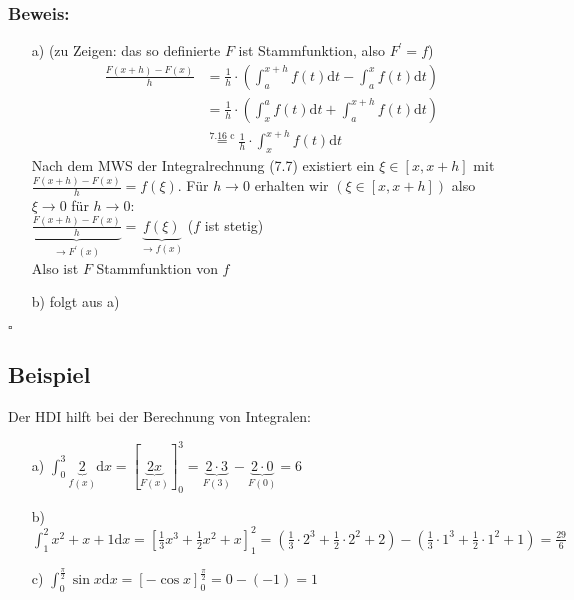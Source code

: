 \documentclass[12pt, titlepage]{article}
\renewcommand{\>}{\rightarrow}
\renewcommand{\*}{\cdot}
\begin{document}
	\subsubsection*{Beweis:}
	\begin{itemize}
		\item[a)] (zu Zeigen: das so definierte $F$ ist Stammfunktion, also $F^\prime=f$)
		\begin{align*}
			\frac{F(x+h)-F(x)}{h}&=\frac{1}{h}\*(\int_{a}^{x+h}f(t)\textrm{d}t-\int_{a}^{x}f(t)\textrm{d}t)\\
			&=\frac{1}{h}\*(\int_{x}^{a}f(t)\textrm{d}t+\int_{a}^{x+h}f(t)\textrm{d}t)\\
			&\overset{\textrm{7.16 c}}{=}\frac{1}{h}\*\int_{x}^{x+h}f(t)\textrm{d}t
		\end{align*}
		Nach dem MWS der Integralrechnung (7.7) existiert ein $\xi\in[x,x+h]$ mit $\frac{F(x+h)-F(x)}{h}=f(\xi)$. Für $h\>0$ erhalten wir $(\xi\in[x,x+h])$ also $\xi\>0$ für $h\>0$:\\
		$\underbrace{\frac{F(x+h)-F(x)}{h}}_{\>F^\prime(x)}=\underbrace{f(\xi)}_{\>f(x)}$ ($f$ ist stetig)\\
		Also ist $F$ Stammfunktion von $f$
		\item[b)] folgt aus a)
	\end{itemize}
	\hfill$\square$
	\subsection{Beispiel}
	Der HDI hilft bei der Berechnung von Integralen:
	\begin{itemize}
		\item[a)] $\int_{0}^{3}\underbrace{2}_{f(x)}\textrm{d}x=[\underbrace{2x}_{F(x)}]^3_0=\underbrace{2\*3}_{F(3)}-\underbrace{2\*0}_{F(0)}=6$
		\item[b)] $\int_{1}^{2}x^2+x+1\textrm{d}x=[\frac{1}{3}x^3+\frac{1}{2}x^2+x]^2_1=(\frac{1}{3}\*2^3+\frac{1}{2}\*2^2+2)-(\frac{1}{3}\*1^3+\frac{1}{2}\*1^2+1)=\frac{29}{6}$
		\item[c)] $\int_{0}^{\frac{\pi}{2}}\sin x\textrm{d}x=[-\cos x]^{\frac{\pi}{2}}_0=0-(-1)=1$
	\end{itemize}
\end{document}
